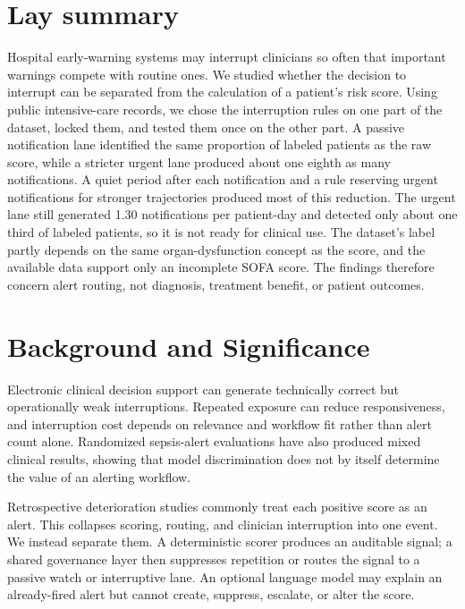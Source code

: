 \documentclass[11pt]{article}
\begin{document}
{\begin{abstract}
\noindent\textbf{Conclusion:} This single-resource, partial-score evaluation
supports further governance research but does not establish diagnosis, clinical
benefit, external validity, or readiness for patient care.
\end{abstract}

\vspace{-0.85em}
\section*{Lay summary}
Hospital early-warning systems may interrupt clinicians so often that important
warnings compete with routine ones. We studied whether the decision to
interrupt can be separated from the calculation of a patient's risk score.
Using public intensive-care records, we chose the interruption rules on one
part of the dataset, locked them, and tested them once on the other part. A
passive notification lane identified the same proportion of labeled patients
as the raw score, while a stricter urgent lane produced about one eighth as many
notifications. A quiet period after each notification and a rule reserving
urgent notifications for stronger trajectories produced most of this
reduction. The urgent lane still generated 1.30 notifications per patient-day
and detected only about one third of labeled patients, so it is not ready for
clinical use. The dataset's label partly depends on the same organ-dysfunction
concept as the score, and the available data support only an incomplete SOFA
score. The findings therefore concern alert routing, not diagnosis, treatment
benefit, or patient outcomes.
}

\doublespacing
\section{Background and Significance}
\label{sec:background}
Electronic clinical decision support can generate technically correct but
operationally weak interruptions. Repeated exposure can reduce responsiveness,
and interruption cost depends on relevance and workflow fit rather than alert
count alone.\citep{embi2012,elias2019} Randomized sepsis-alert evaluations have
also produced mixed clinical results, showing that model discrimination does
not by itself determine the value of an alerting workflow.\citep{downing2019}

Retrospective deterioration studies commonly treat each positive score as an
alert. This collapses scoring, routing, and clinician interruption into one
event. We instead separate them. A deterministic scorer produces an auditable
signal; a shared governance layer then suppresses repetition or routes the
signal to a passive watch or interruptive lane. An optional language model may
explain an already-fired alert but cannot create, suppress, escalate, or alter
the score.
\end{document}
